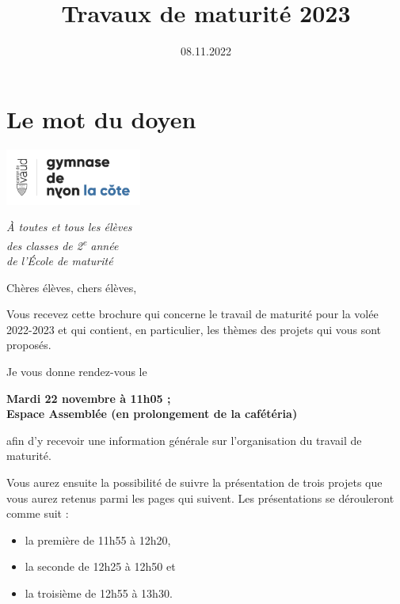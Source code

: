 \documentclass[
  10pt,
  french,
  a5paper,
  openany]{book}
\title{Travaux de maturité 2023}
\author{}
\date{\vspace{-2.5em}08.11.2022}
\providecommand{\tightlist}{%
  \setlength{\itemsep}{0pt}\setlength{\parskip}{0pt}}
\newenvironment{signature}{\begin{flushright}}{\end{flushright}}
\begin{document}
\maketitle

{
\setcounter{tocdepth}{0}
\tableofcontents
}
\hypertarget{le-mot-du-doyen}{%
\chapter*{Le mot du doyen}\label{le-mot-du-doyen}}

\includegraphics[width=\textwidth,height=5em]{images/logoGNLC.png}


\begin{signature}
\emph{À toutes et tous les élèves}\\
\emph{des classes de 2\textsuperscript{e} année}\\
\emph{de l'École de maturité}

\end{signature}


Chères élèves, chers élèves,

Vous recevez cette brochure qui concerne le travail de maturité pour la volée 2022-2023 et qui contient, en particulier, les thèmes des projets qui vous sont proposés.

Je vous donne rendez-vous le

\begin{center}
\textbf{Mardi 22 novembre à 11h05 ;\\
Espace Assemblée (en prolongement de la cafétéria)}

\end{center}

afin d'y recevoir une information générale sur l'organisation du travail de maturité.

Vous aurez ensuite la possibilité de suivre la présentation de trois projets que vous aurez retenus parmi les pages qui suivent. Les présentations se dérouleront comme suit :

\begin{itemize}
\tightlist
\item
  la première de 11h55 à 12h20,
\item
  la seconde de 12h25 à 12h50 et
\item
  la troisième de 12h55 à 13h30.
\end{itemize}
\end{document}
